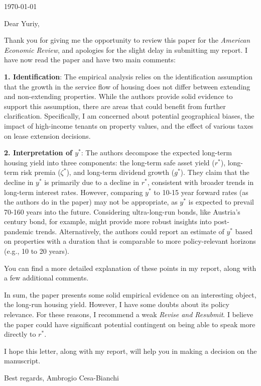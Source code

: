 \documentclass[11pt]{article}
\begin{document}
\thispagestyle{empty}
\setlength{\parindent}{0pt}


\begin{flushright}
	\today
\end{flushright}

\bigskip

Dear Yuriy,

Thank you for giving me the opportunity to review this paper for the \textit{American Economic Review}, and apologies for the slight delay in submitting my report. I have now read the paper and have two main comments:

\textbf{1. Identification}: The empirical analysis relies on the identification assumption that the growth in the service flow of housing does not differ between extending and non-extending properties. While the authors provide solid evidence to support this assumption, there are areas that could benefit from further clarification. Specifically, I am concerned about potential geographical biases, the impact of high-income tenants on property values, and the effect of various taxes on lease extension decisions.

\textbf{2. Interpretation of \( y^* \)}: The authors decompose the expected long-term housing yield into three components: the long-term safe asset yield (\( r^* \)), long-term risk premia (\( \zeta^* \)), and long-term dividend growth (\( g^* \)). They claim that the decline in \( y^* \) is primarily due to a decline in \( r^* \), consistent with broader trends in long-term interest rates. However, comparing \( y^* \) to 10-15 year forward rates (as the authors do in the paper) may not be appropriate, as \( y^* \) is expected to prevail 70-160 years into the future. Considering ultra-long-run bonds, like Austria's century bond, for example, might provide more robust insights into post-pandemic trends. Alternatively, the authors could report an estimate of \( y^* \) based on properties with a duration that is comparable to more policy-relevant horizons (e.g., 10 to 20 years).

You can find a more detailed explanation of these points in my report, along with a few additional comments.

In sum, the paper presents some solid empirical evidence on an interesting object, the long-run housing yield. However, I have some doubts about its policy relevance. For these reasons, I recommend a weak \textit{Revise and Resubmit}. I believe the paper could have significant potential contingent on being able to speak more directly to \( r^* \).

I hope this letter, along with my report, will help you in making a decision on the manuscript.

Best regards,\newline
Ambrogio Cesa-Bianchi
\end{document}
